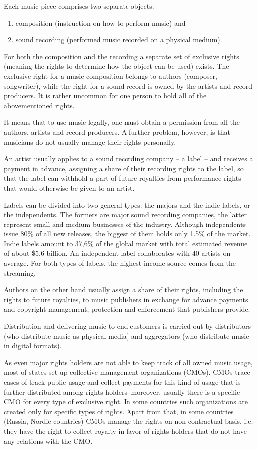 \documentclass[12pt]{report}
\begin{document}
Each music piece comprises two separate objects:
\begin{enumerate}
	\item composition (instruction on how to perform music) and
	\item sound recording (performed music recorded on a physical medium).
\end{enumerate}

For both the composition and the recording a separate set of exclusive rights (meaning the rights to determine how the object can be used) exists. The exclusive right for a music composition belongs to authors (composer, songwriter), while the right for a sound record is owned by the artists and record producers. It is rather uncommon for one person to hold all of the abovementioned rights.

It means that to use music legally, one must obtain a permission from all the authors, artists and record producers. A further problem, however, is that musicians do not usually manage their rights personally.

An artist usually applies to a sound recording company – a label – and receives a payment in advance, assigning a share of their recording rights to the label, so that the label can withhold a part of future royalties from performance rights that would otherwise be given to an artist.

Labels can be divided into two general types: the majors and the indie labels, or the independents. The formers are major sound recording companies, the latter represent small and medium businesses of the industry. Although independents issue 80\% of all new releases, the biggest of them holds only 1.5\% of the market. Indie labels amount to 37,6\% of the global market with total estimated revenue of about \$5.6 billion. An independent label collaborates with 40 artists on average. For both types of labels, the highest income source comes from the streaming.

Authors on the other hand usually assign a share of their rights, including the rights to future royalties, to music publishers in exchange for advance payments and copyright management, protection and enforcement that publishers provide.

Distribution and delivering music to end customers is carried out by distributors (who distribute music as physical media) and aggregators (who distribute music in digital formats).

As even major rights holders are not able to keep track of all owned music usage, most of states set up collective management organizations (CMOs). CMOs trace cases of track public usage and collect payments for this kind of usage that is further distributed among rights holders; moreover, usually there is a specific CMO for every type of exclusive right. In some countries such organizations are created only for specific types of rights. Apart from that, in some countries (Russia, Nordic countries) CMOs manage the rights on non-contractual basis, i.e. they have the right to collect royalty in favor of rights holders that do not have any relations with the CMO.
\end{document}
